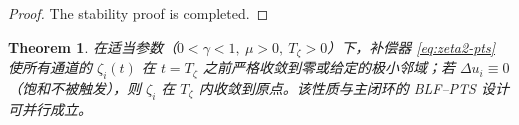 \documentclass[pdflatex,sn-mathphys-num]{sn-jnl}%
\theoremstyle{thmstyleone}%
\newtheorem{theorem}{Theorem}%
\theoremstyle{thmstyletwo}%
\newtheorem{remark}{Remark}%
\theoremstyle{thmstylethree}%
\begin{document}
\begin{proof}
The stability proof is completed.

\end{proof}




\begin{theorem}\label{thm:u-only}
	在适当参数（$0<\gamma<1,\ \mu>0,\ T_\zeta>0$）下，补偿器 \eqref{eq:zeta2-pts} 使所有通道的 $\zeta_{i}(t)$ 在 $t=T_\zeta$ 之前严格收敛到零或给定的极小邻域；若 $\Delta u_i\equiv 0$（饱和不被触发），则 $\zeta_{i}$ 在 $T_\zeta$ 内收敛到原点。该性质与主闭环的 BLF–PTS 设计可并行成立。
	\end{theorem}
	
\end{document}
